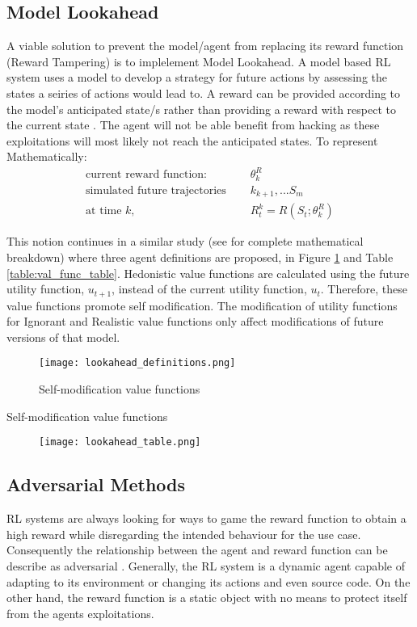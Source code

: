 \subsection{Model Lookahead}
A viable solution to prevent the model/agent from replacing its reward function (Reward Tampering) is to implelement Model Lookahead.
A model based RL system uses a model to develop a strategy for future actions by assessing the states a seiries of actions would lead to.
A reward can be provided according to the model's anticipated state/s rather than providing a reward with respect to the current state \cite{Amodei}.
The agent will not be able benefit from hacking as these exploitations will most likely not reach the anticipated states.
To represent Mathematically:
\begin{align*}
    \text{current reward function: } &\quad\theta^R_k \\
    \text{simulated future trajectories } &\quad  k_{k+1},... S_m  \\
    \text{at time } k, &\quad  R_t^k = R(S_t;\theta^R_k)
\end{align*}
    
This notion continues in a similar study (see for complete mathematical breakdown) \cite{EverittFDH16} where three agent definitions are proposed, in Figure \ref{fig:value_func} and Table \ref{table:val_func_table}.
Hedonistic value functions are calculated using the future utility function, $u_{t+1}$, instead of the current utility function, $u_t$.
Therefore, these value functions promote self modification.
The modification of utility functions for Ignorant and Realistic value functions only affect modifications of future versions of that model.

\begin{figure}[H]
    \centering
    \caption{Self-modification value functions \cite{EverittFDH16}}
    \texttt{[image: lookahead\_definitions.png]}
    \label{fig:value_func}
\end{figure}

\begin{table}[h]
    \bigskip
    \caption{Self-modification value functions \cite{EverittFDH16}}
    \begin{figure}[H]
        \centering
        \texttt{[image: lookahead\_table.png]}
    \end{figure}
    \label{table:val_func_table}
\end{table}

\subsection{Adversarial Methods}
RL systems are always looking for ways to game the reward function to obtain a high reward while disregarding the intended behaviour for the use case.
Consequently the relationship between the agent and reward function can be describe as adversarial \cite{Amodei}.
Generally, the RL system is a dynamic agent capable of adapting to its environment or changing its actions and even source code. 
On the other hand, the reward function is a static object with no means to protect itself from the agents exploitations.

